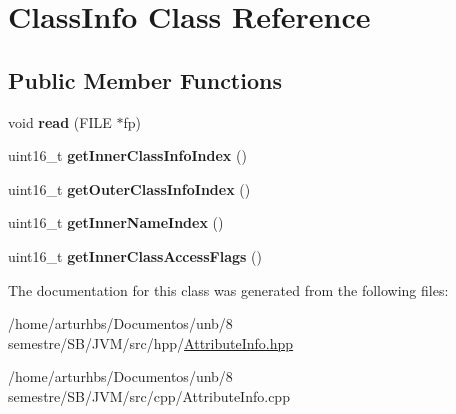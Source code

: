 \hypertarget{classClassInfo}{}\section{Class\+Info Class Reference}
\label{classClassInfo}
\subsection*{Public Member Functions}
\begin{DoxyCompactItemize}
\item 
void {\bfseries read} (F\+I\+LE $\ast$fp)\hypertarget{classClassInfo_ad2e55dfb641367a6f07cbc9a5fee931b}{}\label{classClassInfo_ad2e55dfb641367a6f07cbc9a5fee931b}

\item 
uint16\+\_\+t {\bfseries get\+Inner\+Class\+Info\+Index} ()\hypertarget{classClassInfo_a6355f698a36e546ab8a83aebdd02deaa}{}\label{classClassInfo_a6355f698a36e546ab8a83aebdd02deaa}

\item 
uint16\+\_\+t {\bfseries get\+Outer\+Class\+Info\+Index} ()\hypertarget{classClassInfo_a89d3d35fe30b9846ff6907be50e86b29}{}\label{classClassInfo_a89d3d35fe30b9846ff6907be50e86b29}

\item 
uint16\+\_\+t {\bfseries get\+Inner\+Name\+Index} ()\hypertarget{classClassInfo_a38075d61d6812ecf422de434aa11bb01}{}\label{classClassInfo_a38075d61d6812ecf422de434aa11bb01}

\item 
uint16\+\_\+t {\bfseries get\+Inner\+Class\+Access\+Flags} ()\hypertarget{classClassInfo_a3e09735f9005ba692b86fbde0417b17f}{}\label{classClassInfo_a3e09735f9005ba692b86fbde0417b17f}

\end{DoxyCompactItemize}


The documentation for this class was generated from the following files\+:\begin{DoxyCompactItemize}
\item 
/home/arturhbs/\+Documentos/unb/8 semestre/\+S\+B/\+J\+V\+M/src/hpp/\hyperlink{AttributeInfo_8hpp}{Attribute\+Info.\+hpp}\item 
/home/arturhbs/\+Documentos/unb/8 semestre/\+S\+B/\+J\+V\+M/src/cpp/Attribute\+Info.\+cpp\end{DoxyCompactItemize}

